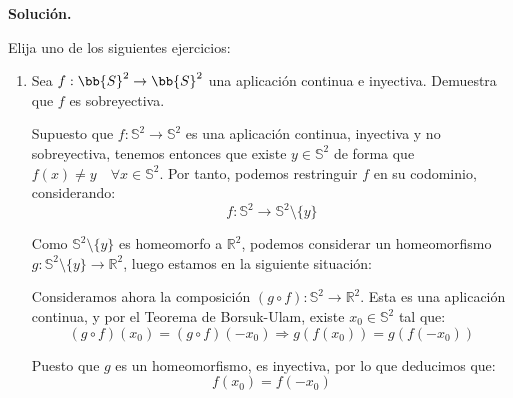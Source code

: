 \documentclass[12pt]{article}
\begin{document}
    \newpage
    \setcounter{ejercicio}{0} %
    \noindent
    \textbf{Solución.}

    \begin{ejercicio}
        Elija uno de los siguientes ejercicios:
        \begin{enumerate}[label=\alph*)]
            \item Sea $f:\bb{S}^2\to \bb{S}^2$ una aplicación continua e inyectiva. Demuestra que $f$ es sobreyectiva.

                Supuesto que $f:\mathbb{S}^2\to\mathbb{S}^2$  es una aplicación continua, inyectiva y no sobreyectiva, tenemos entonces que existe $y\in \mathbb{S}^2$ de forma que $f(x)\neq y \quad \forall x\in \mathbb{S}^2$. Por tanto, podemos restringuir $f$ en su codominio, considerando:
                \begin{equation*}
                    f:\mathbb{S}^2\to \mathbb{S}^2\setminus \{y\}
                \end{equation*}                
                
                Como $\mathbb{S}^2\setminus \{y\}$ es homeomorfo a $\mathbb{R}^2$, podemos considerar un homeomorfismo $g:\mathbb{S}^2\setminus \{y\}\to \mathbb{R}^2$, luego estamos en la siguiente situación:
                \begin{center}
                \end{center}
                
                
                Consideramos ahora la composición $(g\circ f):\mathbb{S}^2\to \mathbb{R}^2$. Esta es una aplicación continua, y por el Teorema de Borsuk-Ulam, existe $x_0\in \mathbb{S}^2$ tal que:
                \begin{equation*}
                    (g\circ f)(x_0) = (g\circ f)(-x_0)
                    \Longrightarrow g(f(x_0)) = g(f(-x_0))
                \end{equation*}

                Puesto que $g$ es un homeomorfismo, es inyectiva, por lo que deducimos que:
                \begin{equation*}
                    f(x_0) = f(-x_0)
                \end{equation*}


\end{enumerate}
\end{ejercicio}
\end{document}
